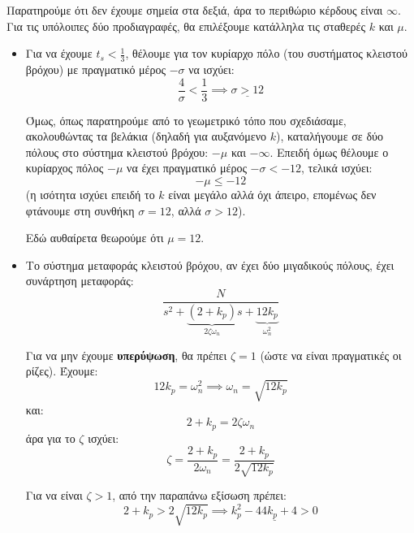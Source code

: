 \documentclass[11pt,a4paper,notitlepage,fleqn,final]{article}
\begin{document}
\begin{exercise}

Παρατηρούμε ότι δεν έχουμε σημεία στα δεξιά, άρα το περιθώριο κέρδους είναι \( \infty \).
Για τις υπόλοιπες δύο προδιαγραφές, θα επιλέξουμε κατάλληλα τις σταθερές \( k \) και
\( μ \).

\begin{itemize}
	\item Για να έχουμε \( t_s < \frac{1}{3} \), θέλουμε για τον κυρίαρχο πόλο (του
	συστήματος κλειστού βρόχου) με πραγματικό
	μέρος \( -σ \) να ισχύει:
	\[
	\frac{4}{σ} < \frac{1}{3} \implies \underline{σ>12}
	\]
	
	Όμως, όπως παρατηρούμε από το γεωμετρικό τόπο που σχεδιάσαμε, ακολουθώντας τα βελάκια
	(δηλαδή για αυξανόμενο \( k \)), καταλήγουμε σε δύο πόλους στο σύστημα
	κλειστού βρόχου: \( -μ \) και \( -\infty \). Επειδή όμως θέλουμε ο κυρίαρχος πόλος
	\( -μ \) να έχει πραγματικό μέρος \( -σ < -12 \), τελικά ισχύει:
	\[
	-μ \leq -12
	\]
	(η ισότητα ισχύει επειδή το \( k \) είναι μεγάλο αλλά όχι άπειρο, επομένως δεν φτάνουμε
	στη συνθήκη \( σ = 12 \), αλλά \( σ>12 \)).
	
	Εδώ αυθαίρετα θεωρούμε ότι \( μ=12 \). 
	
	\item Το σύστημα μεταφοράς κλειστού βρόχου, αν έχει δύο μιγαδικούς πόλους,
	έχει συνάρτηση μεταφοράς:
	\[
	\frac{N}{s^2 + \underbrace{(2+k_p)}_{2ζ\omega_n} s + \underbrace{12k_p}_{\omega_n^2}}
	\]
	
	Για να μην έχουμε \textbf{υπερύψωση}, θα πρέπει \( ζ = 1 \) (ώστε να είναι πραγματικές
	οι ρίζες). Έχουμε:
	\[
		12k_p = \omega_n^2
		\implies \omega_n = \sqrt{12 k_p}
	\]
	και:
	\[
	2+k_p = 2ζ\omega_n
	\]
	άρα για το \( ζ \) ισχύει:
	\[
	ζ = \frac{2+k_p}{2\omega_n} = \frac{2+k_p}{2\sqrt{12k_p}}
	\]
	
	Για να είναι \( ζ>1 \), από την παραπάνω εξίσωση πρέπει:
	\[
	2+k_p > 2\sqrt{12k_p} \implies \underline{k_p^2-44k_p+4 > 0}
	\]
	

\end{itemize}
\end{exercise}
\end{document}
